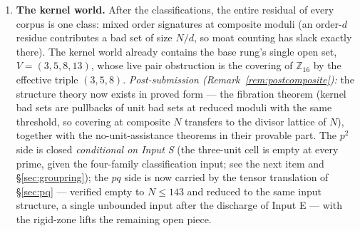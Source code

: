 \documentclass[11pt,a4paper]{article}
\numberwithin{equation}{section}
\theoremstyle{plain}
\theoremstyle{definition}
\theoremstyle{remark}
\newcommand{\Z}{\mathbb{Z}}
\begin{document}
\begin{enumerate}[leftmargin=1.7em,itemsep=4pt]
\item \textbf{The kernel world.} After the classifications, the entire
  residual of every corpus is one class: mixed order signatures at
  composite moduli (an order-$d$ residue contributes a bad set of size
  $N/d$, so moat counting has slack exactly there). The kernel world
  already contains the base rung's single open set,
  $V=(3,5,8,13)$, whose live pair obstruction is the covering of
  $\Z_{16}$ by the effective triple $(3,5,8)$. \emph{Post-submission
  (Remark~\ref{rem:postcomposite}):} the structure theory now exists in
  proved form --- the fibration theorem (kernel bad sets are pullbacks of
  unit bad sets at reduced moduli with the same threshold, so covering at
  composite $N$ transfers to the divisor lattice of $N$), together with
  the no-unit-assistance theorems in their provable part. The $p^2$ side
  is closed \emph{conditional on Input S} (the three-unit cell is empty
  at every prime, given the four-family classification input; see
  the next item and \S\ref{sec:groupring}); the $pq$ side is now carried
  by the tensor translation
  of \S\ref{sec:pq} --- verified empty to $N\le143$ and reduced to the
  same input structure, a single unbounded input after the
  discharge of Input E --- with the rigid-zone lifts the remaining open
  piece.


\end{enumerate}
\end{document}
